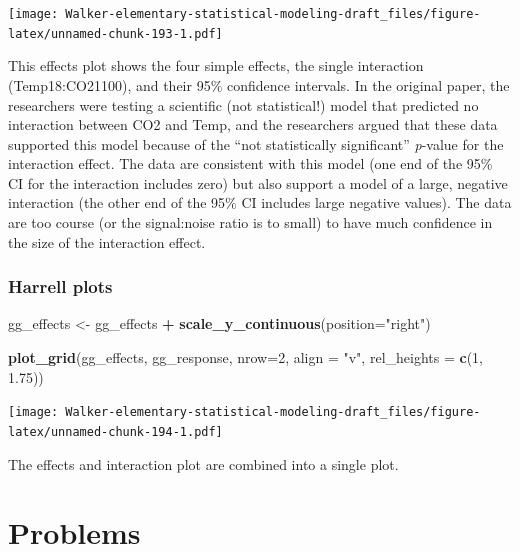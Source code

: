 \documentclass[]{book}
\newenvironment{Shaded}{\begin{snugshade}}{\end{snugshade}}
\newcommand{\DataTypeTok}[1]{\textcolor[rgb]{0.13,0.29,0.53}{#1}}
\newcommand{\DecValTok}[1]{\textcolor[rgb]{0.00,0.00,0.81}{#1}}
\newcommand{\FloatTok}[1]{\textcolor[rgb]{0.00,0.00,0.81}{#1}}
\newcommand{\KeywordTok}[1]{\textcolor[rgb]{0.13,0.29,0.53}{\textbf{#1}}}
\newcommand{\NormalTok}[1]{#1}
\newcommand{\OperatorTok}[1]{\textcolor[rgb]{0.81,0.36,0.00}{\textbf{#1}}}
\newcommand{\StringTok}[1]{\textcolor[rgb]{0.31,0.60,0.02}{#1}}
\begin{document}
\texttt{[image: Walker-elementary-statistical-modeling-draft\_files/figure-latex/unnamed-chunk-193-1.pdf]}

This effects plot shows the four simple effects, the single interaction (Temp18:CO21100), and their 95\% confidence intervals. In the original paper, the researchers were testing a scientific (not statistical!) model that predicted no interaction between CO2 and Temp, and the researchers argued that these data supported this model because of the ``not statistically significant'' \emph{p}-value for the interaction effect. The data are consistent with this model (one end of the 95\% CI for the interaction includes zero) but also support a model of a large, negative interaction (the other end of the 95\% CI includes large negative values). The data are too course (or the signal:noise ratio is to small) to have much confidence in the size of the interaction effect.

\hypertarget{harrell-plots}{%
\subsubsection{Harrell plots}\label{harrell-plots}}

\begin{Shaded}
\begin{Highlighting}[]
\NormalTok{gg_effects <-}\StringTok{ }\NormalTok{gg_effects }\OperatorTok{+}\StringTok{ }\KeywordTok{scale_y_continuous}\NormalTok{(}\DataTypeTok{position=}\StringTok{"right"}\NormalTok{)}

\KeywordTok{plot_grid}\NormalTok{(gg_effects, gg_response, }\DataTypeTok{nrow=}\DecValTok{2}\NormalTok{, }
          \DataTypeTok{align =} \StringTok{"v"}\NormalTok{, }
          \DataTypeTok{rel_heights =} \KeywordTok{c}\NormalTok{(}\DecValTok{1}\NormalTok{, }\FloatTok{1.75}\NormalTok{))}
\end{Highlighting}
\end{Shaded}

\texttt{[image: Walker-elementary-statistical-modeling-draft\_files/figure-latex/unnamed-chunk-194-1.pdf]}

The effects and interaction plot are combined into a single plot.

\hypertarget{problems-1}{%
\section{Problems}\label{problems-1}}
\end{document}
